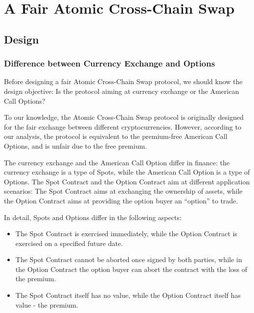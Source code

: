 \section{A Fair Atomic Cross-Chain Swap}
\label{sec:fair_atomic_swap}

\subsection{Design}


\subsubsection{Difference between Currency Exchange and Options}


Before designing a fair Atomic Cross-Chain Swap protocol, we should know the design objective:
Is the protocol aiming at currency exchange or the American Call Options?

To our knowledge, the Atomic Cross-Chain Swap protocol is originally designed for the fair exchange between different cryptocurrencies.
However, according to our analysis, the protocol is equivalent to the premium-free American Call Options, and is unfair due to the free premium.

The currency exchange and the American Call Option differ in finance: the currency exchange is a type of Spots, while the American Call Option is a type of Options.
The Spot Contract and the Option Contract aim at different application scenarios: The Spot Contract aims at exchanging the ownership of assets, while the Option Contract aims at providing the option buyer an ``option'' to trade.

In detail, Spots and Options differ in the following aspects:

\begin{itemize}
    \item The Spot Contract is exercised immediately, while the Option Contract is exercised on a specified future date.
    \item The Spot Contract cannot be aborted once signed by both parties, while in the Option Contract the option buyer can abort the contract with the loss of the premium.
    \item The Spot Contract itself has no value, while the Option Contract itself has value - the premium.
\end{itemize}

